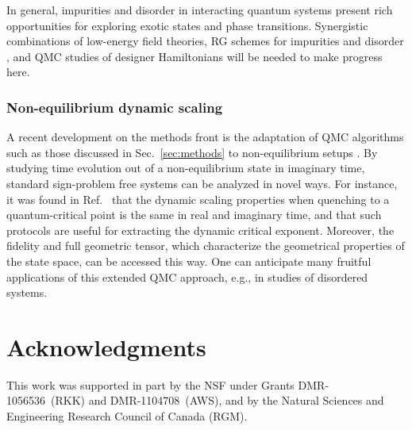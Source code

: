 \documentclass[range]{ar2e}
\begin{document}
In general, impurities and disorder in interacting quantum systems present rich opportunities for exploring exotic states and phase transitions.
Synergistic combinations of low-energy field theories, RG schemes for impurities \cite{Vojta12} and disorder \cite{Hoyos08,Vojta10,Altman10,Iyer12}, 
and QMC studies of designer Hamiltonians will be needed to make progress here.

\subsubsection{Non-equilibrium dynamic scaling}

A recent development on the methods front is the adaptation of QMC algorithms such as those discussed in Sec.~\ref{sec:methods} to non-equilibrium 
setups \cite{Degrandi11}. By studying time evolution out of a non-equilibrium state in imaginary time, standard sign-problem free systems
can be analyzed in novel ways. For instance, it was found in Ref.~\cite{Degrandi11} that the dynamic scaling properties when quenching to
a quantum-critical point is the same in real and imaginary time, and that such protocols are useful for extracting the dynamic critical
exponent. Moreover, the fidelity and full geometric tensor, which characterize the geometrical properties of the state space, can be
accessed this way. One can anticipate many fruitful applications of this extended QMC approach, e.g., in studies of disordered systems.

\section*{Acknowledgments}

This work was supported in part by the NSF under Grants DMR-1056536~(RKK) and DMR-1104708~(AWS), and by the Natural Sciences and Engineering Research Council of Canada (RGM).



\end{document}
